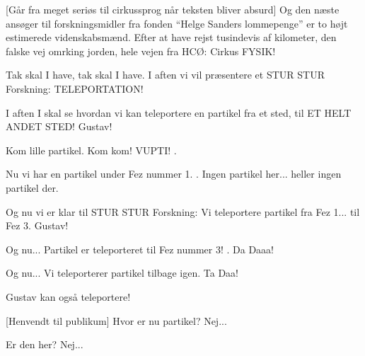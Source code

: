 \documentclass[a4paper,11pt]{article}
\begin{document}
  
\begin{sketch}

[Går fra meget seriøs til cirkussprog når teksten bliver absurd] Og den næste ansøger til forskningsmidler fra fonden ``Helge Sanders lommepenge'' er to højt estimerede videnskabsmænd. Efter at have rejst tusindevis af kilometer, den falske vej omrking jorden, hele vejen fra HCØ: Cirkus FYSIK!


 Tak skal I have, tak skal I have. I aften vi vil præsentere et 
STUR STUR Forskning: TELEPORTATION! 


 I aften I skal se hvordan vi kan teleportere en partikel fra 
et sted, til ET HELT ANDET STED! Gustav! 

 Kom lille partikel. Kom kom!  VUPTI! . 

 Nu vi har en partikel under Fez nummer 1. .  Ingen partikel her... heller ingen partikel der.

 Og nu vi er klar til STUR STUR Forskning: Vi teleportere partikel fra Fez 1...  til Fez 3. Gustav! 


 Og nu... Partikel er teleporteret til Fez nummer 3! . Da Daaa!

 Og nu... Vi teleporterer partikel tilbage igen.  Ta Daa!


 Gustav kan også teleportere!  

[Henvendt til publikum] Hvor er nu partikel?  Nej...

 Er den her?  Nej...


\end{sketch}
\end{document}
